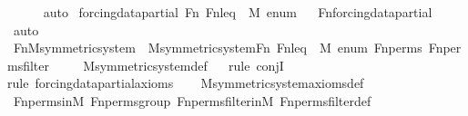 \begin{isabellebody}
\ \ \ \ \isamarkupfalse%
\ auto\isanewline
{}\isamarkupfalse%
%
\endisatagproof
{\isafoldproof}%
%
\isadelimproof
\isanewline
%
\endisadelimproof
\isanewline
{}\isamarkupfalse%
\ forcing{\isacharunderscore}{\kern0pt}data{\isacharunderscore}{\kern0pt}partial\ {\isachardoublequoteopen}Fn{\isachardoublequoteclose}\ {\isachardoublequoteopen}Fn{\isacharunderscore}{\kern0pt}leq{\isachardoublequoteclose}\ {\isachardoublequoteopen}{}{\isachardoublequoteclose}\ {\isachardoublequoteopen}M{\isachardoublequoteclose}\ {\isachardoublequoteopen}enum{\isachardoublequoteclose}%
\isadelimproof
\ %
\endisadelimproof
%
\isatagproof
{}\isamarkupfalse%
\ Fn{\isacharunderscore}{\kern0pt}forcing{\isacharunderscore}{\kern0pt}data{\isacharunderscore}{\kern0pt}partial\ \isamarkupfalse%
\ auto%
\endisatagproof
{\isafoldproof}%
%
\isadelimproof
%
\endisadelimproof
\isanewline
\isanewline
{}\isamarkupfalse%
\ Fn{\isacharunderscore}{\kern0pt}M{\isacharunderscore}{\kern0pt}symmetric{\isacharunderscore}{\kern0pt}system\ {\isacharcolon}{\kern0pt}\ {\isachardoublequoteopen}M{\isacharunderscore}{\kern0pt}symmetric{\isacharunderscore}{\kern0pt}system{\isacharparenleft}{\kern0pt}Fn{\isacharcomma}{\kern0pt}\ Fn{\isacharunderscore}{\kern0pt}leq{\isacharcomma}{\kern0pt}\ {}{\isacharcomma}{\kern0pt}\ M{\isacharcomma}{\kern0pt}\ enum{\isacharcomma}{\kern0pt}\ Fn{\isacharunderscore}{\kern0pt}perms{\isacharcomma}{\kern0pt}\ Fn{\isacharunderscore}{\kern0pt}perms{\isacharunderscore}{\kern0pt}filter{\isacharparenright}{\kern0pt}{\isachardoublequoteclose}\ \isanewline
%
\isadelimproof
\ \ %
\endisadelimproof
%
\isatagproof
{}\isamarkupfalse%
\ M{\isacharunderscore}{\kern0pt}symmetric{\isacharunderscore}{\kern0pt}system{\isacharunderscore}{\kern0pt}def\isanewline
\ \ \isamarkupfalse%
{\isacharparenleft}{\kern0pt}rule\ conjI{\isacharparenright}{\kern0pt}\isanewline
\ \ \ \isamarkupfalse%
{\isacharparenleft}{\kern0pt}rule\ forcing{\isacharunderscore}{\kern0pt}data{\isacharunderscore}{\kern0pt}partial{\isacharunderscore}{\kern0pt}axioms{\isacharparenright}{\kern0pt}\isanewline
\ \ \isamarkupfalse%
\ M{\isacharunderscore}{\kern0pt}symmetric{\isacharunderscore}{\kern0pt}system{\isacharunderscore}{\kern0pt}axioms{\isacharunderscore}{\kern0pt}def\ \isanewline
\ \ \isamarkupfalse%
\ Fn{\isacharunderscore}{\kern0pt}perms{\isacharunderscore}{\kern0pt}in{\isacharunderscore}{\kern0pt}M\ Fn{\isacharunderscore}{\kern0pt}perms{\isacharunderscore}{\kern0pt}group\ Fn{\isacharunderscore}{\kern0pt}perms{\isacharunderscore}{\kern0pt}filter{\isacharunderscore}{\kern0pt}in{\isacharunderscore}{\kern0pt}M\ Fn{\isacharunderscore}{\kern0pt}perms{\isacharunderscore}{\kern0pt}filter{\isacharunderscore}{\kern0pt}def\isanewline

\end{isabellebody}
